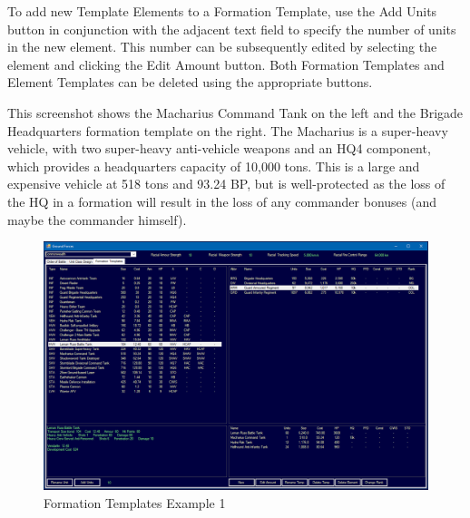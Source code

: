 \documentclass[../Aurora C# unofficial manual.tex]{subfiles}
\begin{document}
	To add new Template Elements to a Formation Template, use the Add Units button in conjunction with the adjacent text field to specify the number of units in the new element. This number can be subsequently edited by selecting the element and clicking the Edit Amount button. Both Formation Templates and Element Templates can be deleted using the appropriate buttons.
	
	This screenshot shows the Macharius Command Tank on the left and the Brigade Headquarters formation template on the right. The Macharius is a super-heavy vehicle, with two super-heavy anti-vehicle weapons and an HQ4 component, which provides a headquarters capacity of 10,000 tons. This is a large and expensive vehicle at 518 tons and 93.24 BP, but is well-protected as the loss of the HQ in a formation will result in the loss of any commander bonuses (and maybe the commander himself).
	\begin{figure}[H]
		\centering
		\includegraphics[width=0.95\linewidth]{images/FormationTemplates}
		\caption[Formation Templates]{Formation Templates Example 1}
		\label{fig:formationtemplates}
	\end{figure}
	
\end{document}
